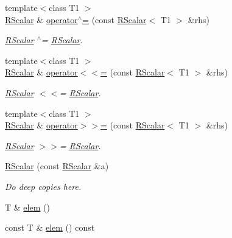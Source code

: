 \begin{DoxyCompactItemize}
{\footnotesize template$<$class T1 $>$ }\\\mbox{\hyperlink{classENSEM_1_1RScalar}{R\+Scalar}} \& \mbox{\hyperlink{classENSEM_1_1RScalar_ad69bdf7cec58f8ef8a8a42b250d97b25}{operator$^\wedge$=}} (const \mbox{\hyperlink{classENSEM_1_1RScalar}{R\+Scalar}}$<$ T1 $>$ \&rhs)
\begin{DoxyCompactList}\small\item\em \mbox{\hyperlink{classENSEM_1_1RScalar}{R\+Scalar}} $^\wedge$= \mbox{\hyperlink{classENSEM_1_1RScalar}{R\+Scalar}}. \end{DoxyCompactList}\item 
{\footnotesize template$<$class T1 $>$ }\\\mbox{\hyperlink{classENSEM_1_1RScalar}{R\+Scalar}} \& \mbox{\hyperlink{classENSEM_1_1RScalar_a4f12bedac2ac4848354e3c3018f6c9aa}{operator$<$$<$=}} (const \mbox{\hyperlink{classENSEM_1_1RScalar}{R\+Scalar}}$<$ T1 $>$ \&rhs)
\begin{DoxyCompactList}\small\item\em \mbox{\hyperlink{classENSEM_1_1RScalar}{R\+Scalar}} $<$$<$= \mbox{\hyperlink{classENSEM_1_1RScalar}{R\+Scalar}}. \end{DoxyCompactList}\item 
{\footnotesize template$<$class T1 $>$ }\\\mbox{\hyperlink{classENSEM_1_1RScalar}{R\+Scalar}} \& \mbox{\hyperlink{classENSEM_1_1RScalar_a35379cd7317c2c533aa26e3c15a9b03f}{operator$>$$>$=}} (const \mbox{\hyperlink{classENSEM_1_1RScalar}{R\+Scalar}}$<$ T1 $>$ \&rhs)
\begin{DoxyCompactList}\small\item\em \mbox{\hyperlink{classENSEM_1_1RScalar}{R\+Scalar}} $>$$>$= \mbox{\hyperlink{classENSEM_1_1RScalar}{R\+Scalar}}. \end{DoxyCompactList}\item 
\mbox{\hyperlink{classENSEM_1_1RScalar_a6aff5b3d3e105c89b56329e817eca759}{R\+Scalar}} (const \mbox{\hyperlink{classENSEM_1_1RScalar}{R\+Scalar}} \&a)
\begin{DoxyCompactList}\small\item\em Do deep copies here. \end{DoxyCompactList}\item 
T \& \mbox{\hyperlink{classENSEM_1_1RScalar_ac1e3c3dba2379fdcea237f7c2bbb1e0e}{elem}} ()
\item 
const T \& \mbox{\hyperlink{classENSEM_1_1RScalar_a26bfcd896407f15877920b5f737119fe}{elem}} () const
\item 

\end{DoxyCompactItemize}
